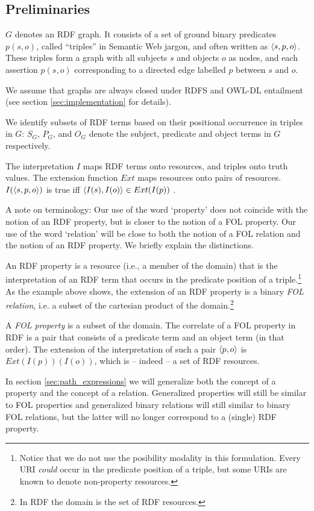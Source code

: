 \subsection{Preliminaries}
\label{sec:preliminaries}

$G$ denotes an RDF graph. It consists of a set of ground binary
predicates $p(s,o)$, called ``triples'' in Semantic Web jargon, and often
written as $\langle s,p,o\rangle$. These triples form a graph with all
subjects $s$ and objects $o$ as nodes, and 
each assertion $p(s,o)$ corresponding to a directed edge labelled $p$
between $s$ and $o$. 

We assume that graphs are always closed under
  RDFS and OWL-DL entailment
  (see section \ref{sec:implementation} for details).

We identify subsets of RDF terms based on
  their positional occurrence in triples in $G$:
  $S_G$, $P_G$, and $O_G$ denote the subject, predicate and object terms
  in $G$ respectively.

The interpretation $I$ maps RDF terms onto resources,
  and triples onto truth values.
The extension function $Ext$ maps resources onto pairs of resources.
$I(\langle s,p,o\rangle)$ is true iff
  $\langle I(s),I(o)\rangle \in Ext(I(p))$ \cite{Hayes2004}.

A note on terminology: Our use of the word `property' does not coincide
  with the notion of an RDF property, but is closer to the notion
  of a FOL property. Our use of the word `relation' will be close to
  both the notion of a FOL relation and the notion of an RDF property.
  We briefly explain the distinctions.

An RDF property is a resource (i.e., a member of the domain)
  that is the interpretation of
  an RDF term that occurs in the predicate position of a triple.\footnote{
    Notice that we do not use the posibility modality in this formulation.
    Every URI \emph{could} occur in the predicate position of a triple,
      but some URIs are known to denote non-property resources.
  }
As the example above shows, the extension of an RDF property is
  a binary \emph{FOL relation},
  i.e. a subset of the cartesian product of the domain.\footnote{
    In RDF the domain is the set of RDF resources.}

A \emph{FOL property} is a subset of the domain.
The correlate of a FOL property in RDF is a pair that consists of
  a predicate term and an object term (in that order).
The extension of the interpretation of such a pair $\langle p,o\rangle$
  is $Ext(I(p))(I(o))$, which is -- indeed -- a set of RDF resources.

In section \ref{sec:path_expressions} we will generalize
  both the concept of a property and the concept of a relation.
Generalized properties will still be similar to FOL properties
  and generalized binary relations will still similar to binary FOL relations,
  but the latter will no longer correspond to a (single) RDF property.

\begin{comment}
$\equivset{x}$ is the equivalence class for $x$
  under equivalence relation $\approx$.
\end{comment}

